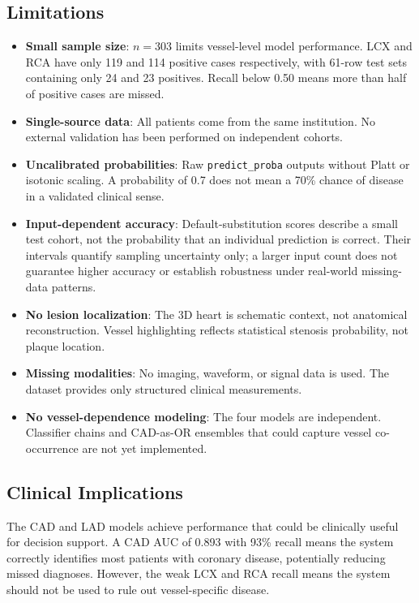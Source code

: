 \documentclass[conference]{IEEEtran}
\begin{document}
\subsection{Limitations}

\begin{itemize}
    \item \textbf{Small sample size}: $n = 303$ limits vessel-level model performance. LCX and RCA have only 119 and 114 positive cases respectively, with 61-row test sets containing only 24 and 23 positives. Recall below 0.50 means more than half of positive cases are missed.
    \item \textbf{Single-source data}: All patients come from the same institution. No external validation has been performed on independent cohorts.
    \item \textbf{Uncalibrated probabilities}: Raw \texttt{predict\_proba} outputs without Platt or isotonic scaling. A probability of 0.7 does not mean a 70\% chance of disease in a validated clinical sense.
    \item \textbf{Input-dependent accuracy}: Default-substitution scores describe a small test cohort, not the probability that an individual prediction is correct. Their intervals quantify sampling uncertainty only; a larger input count does not guarantee higher accuracy or establish robustness under real-world missing-data patterns.
    \item \textbf{No lesion localization}: The 3D heart is schematic context, not anatomical reconstruction. Vessel highlighting reflects statistical stenosis probability, not plaque location.
    \item \textbf{Missing modalities}: No imaging, waveform, or signal data is used. The dataset provides only structured clinical measurements.
    \item \textbf{No vessel-dependence modeling}: The four models are independent. Classifier chains and CAD-as-OR ensembles that could capture vessel co-occurrence are not yet implemented.
\end{itemize}

\subsection{Clinical Implications}

The CAD and LAD models achieve performance that could be clinically useful for decision support. A CAD AUC of 0.893 with 93\% recall means the system correctly identifies most patients with coronary disease, potentially reducing missed diagnoses. However, the weak LCX and RCA recall means the system should not be used to rule out vessel-specific disease.
\end{document}
